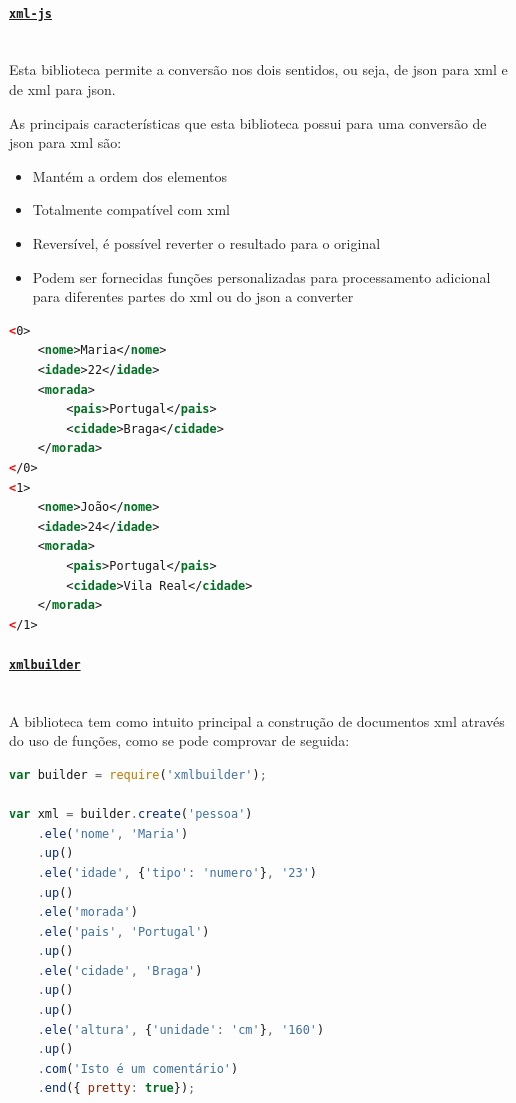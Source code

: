 \paragraph{\href{https://www.npmjs.com/package/xml-js}{\texttt{xml-js}}} \mbox{} \\

Esta biblioteca permite a conversão nos dois sentidos, ou seja, de \acrshort{json} para \acrshort{xml} e de \acrshort{xml} para \acrshort{json}.

As principais características que esta biblioteca possui para uma conversão de \acrshort{json} para \acrshort{xml} são:
\begin{itemize}
    \item Mantém a ordem dos elementos
    \item Totalmente compatível com \acrshort{xml}
    \item Reversível, é possível reverter o resultado para o original
    \item Podem ser fornecidas funções personalizadas para processamento adicional para diferentes partes do \acrshort{xml} ou do \acrshort{json} a converter
\end{itemize}

\begin{lstlisting}[language=xml, caption=Resultado da conversão do exemplo~\ref{exem:jsonBib} usando o conversor \texttt{xml-js}]
<0>
    <nome>Maria</nome>
    <idade>22</idade>
    <morada>
        <pais>Portugal</pais>
        <cidade>Braga</cidade>
    </morada>
</0>
<1>
    <nome>João</nome>
    <idade>24</idade>
    <morada>
        <pais>Portugal</pais>
        <cidade>Vila Real</cidade>
    </morada>
</1>
\end{lstlisting}

\paragraph{\href{https://www.npmjs.com/package/xmlbuilder}{\texttt{xmlbuilder}}} \mbox{} \\

A biblioteca tem como intuito principal a construção de documentos \acrshort{xml} através do uso de funções, como se pode comprovar de seguida:

\begin{lstlisting}[language=javascript, caption=Código para a construção em \acrshort{xml} do exemplo~\ref{exem:xmlEx} usando o \texttt{xmlbuilder}]
var builder = require('xmlbuilder');
 
var xml = builder.create('pessoa')
    .ele('nome', 'Maria')
    .up()
    .ele('idade', {'tipo': 'numero'}, '23')
    .up()
    .ele('morada')
    .ele('pais', 'Portugal')
    .up()
    .ele('cidade', 'Braga')
    .up()
    .up()
    .ele('altura', {'unidade': 'cm'}, '160')
    .up()
    .com('Isto é um comentário')
    .end({ pretty: true});
\end{lstlisting}

